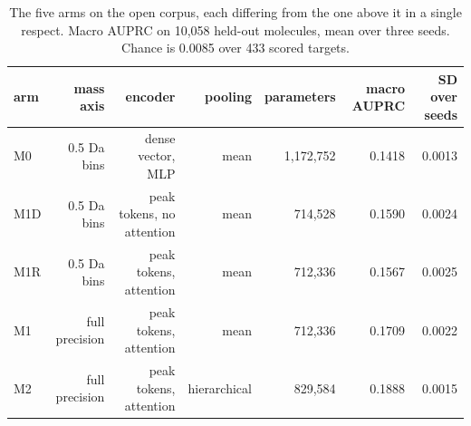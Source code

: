 \begin{table}[htbp]
\centering
\caption{The five arms on the open corpus, each differing from the one above it in a single respect. Macro AUPRC on 10,058 held-out molecules, mean over three seeds. Chance is 0.0085 over 433 scored targets.}
\label{tab:table1_arms_open}
\begin{tabular}{l r r r r r r}
\toprule
arm & mass axis & encoder & pooling & parameters & macro AUPRC & SD over seeds \\
\midrule
M0 & 0.5 Da bins & dense vector, MLP & mean & 1,172,752 & 0.1418 & 0.0013 \\
M1D & 0.5 Da bins & peak tokens, no attention & mean & 714,528 & 0.1590 & 0.0024 \\
M1R & 0.5 Da bins & peak tokens, attention & mean & 712,336 & 0.1567 & 0.0025 \\
M1 & full precision & peak tokens, attention & mean & 712,336 & 0.1709 & 0.0022 \\
M2 & full precision & peak tokens, attention & hierarchical & 829,584 & 0.1888 & 0.0015 \\
\bottomrule
\end{tabular}
\end{table}
